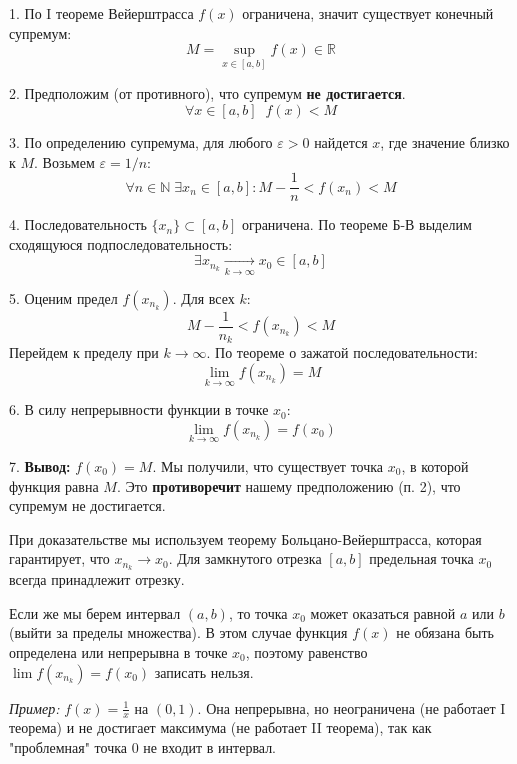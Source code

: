 \begin{tcolorbox}[title=Доказательство (для максимума)]
	1. По I теореме Вейерштрасса $f(x)$ ограничена, значит существует конечный супремум:
	\[ M = \sup_{x\in[a, b]} f(x) \in \mathbb{R} \]
	
	2. Предположим (от противного), что супремум \textbf{не достигается}.
	\[ \forall x \in [a, b]\;\; f(x) < M \]
	
	3. По определению супремума, для любого $\varepsilon > 0$ найдется $x$, где значение близко к $M$. Возьмем $\varepsilon = 1/n$:
	\[ \forall n \in \mathbb{N}\; \exists x_n \in [a, b]: M - \frac{1}{n} < f(x_n) < M \]
	
	4. Последовательность $\{x_n\} \subset [a, b]$ ограничена. По теореме Б-В выделим сходящуюся подпоследовательность:
	\[ \exists x_{n_k} \xrightarrow[k\to \infty]{} x_0 \in [a, b] \]
	
	5. Оценим предел $f(x_{n_k})$. Для всех $k$:
	\[ M - \frac{1}{n_k} < f(x_{n_k}) < M \]
	Перейдем к пределу при $k \to \infty$. По теореме о зажатой последовательности:
	\[ \lim_{k\to\infty} f(x_{n_k}) = M \]
	
	6. В силу непрерывности функции в точке $x_0$:
	\[ \lim_{k\to\infty} f(x_{n_k}) = f(x_0) \]
	
	7. \textbf{Вывод:} $f(x_0) = M$.
	Мы получили, что существует точка $x_0$, в которой функция равна $M$. Это \textbf{противоречит} нашему предположению (п. 2), что супремум не достигается.
\end{tcolorbox}

\begin{tcolorbox}[title={Ответ на вопрос: Что ломается на интервале $(a, b)$?}]
	При доказательстве мы используем теорему Больцано-Вейерштрасса, которая гарантирует, что $x_{n_k} \to x_0$.
	Для замкнутого отрезка $[a, b]$ предельная точка $x_0$ всегда принадлежит отрезку.
	
	Если же мы берем интервал $(a, b)$, то точка $x_0$ может оказаться равной $a$ или $b$ (выйти за пределы множества).
	В этом случае функция $f(x)$ не обязана быть определена или непрерывна в точке $x_0$, поэтому равенство $\lim f(x_{n_k}) = f(x_0)$ записать нельзя.
	
	\textit{Пример:} $f(x) = \frac{1}{x}$ на $(0, 1)$. Она непрерывна, но неограничена (не работает I теорема) и не достигает максимума (не работает II теорема), так как "проблемная" точка $0$ не входит в интервал.
\end{tcolorbox}
